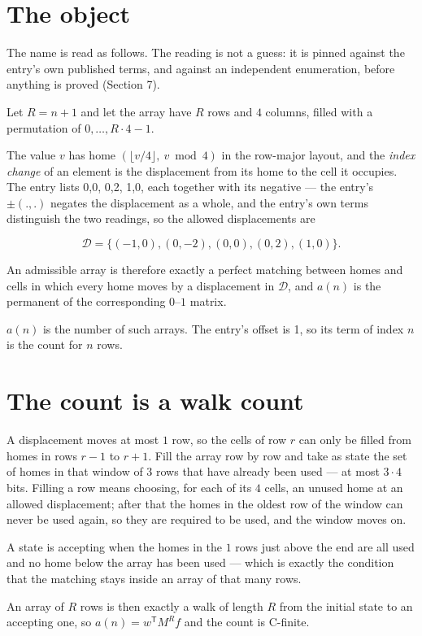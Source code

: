 \documentclass[11pt]{article}
\theoremstyle{definition}
\begin{document}
\section{The object}

The name is read as follows. The reading is not a guess: it is pinned against the entry's own published terms, and against an independent enumeration, before anything is proved (Section 7).

Let $R = n + 1$ and let the array have $R$ rows and $4$ columns, filled with a permutation of $0,\dots,R\cdot4-1$.

The value $v$ has home $(\lfloor v/4\rfloor,\ v \bmod 4)$ in the row-major layout, and the {\itshape index change} of an element is the displacement from its home to the cell it occupies. The entry lists 0,0, 0,2, 1,0, each together with its negative --- the entry's $\pm(.,.)$ negates the displacement as a whole, and the entry's own terms distinguish the two readings, so the allowed displacements are

\[\mathcal{D} = \{(-1,0), (0,-2), (0,0), (0,2), (1,0)\}.\]

An admissible array is therefore exactly a perfect matching between homes and cells in which every home moves by a displacement in $\mathcal{D}$, and $a(n)$ is the permanent of the corresponding $0$--$1$ matrix.

$a(n)$ is the number of such arrays. The entry's offset is 1, so its term of index $n$ is the count for $n$ rows.

\section{The count is a walk count}

A displacement moves at most $1$ row, so the cells of row $r$ can only be filled from homes in rows $r-1$ to $r+1$. Fill the array row by row and take as state the set of homes in that window of $3$ rows that have already been used --- at most $3\cdot4$ bits. Filling a row means choosing, for each of its $4$ cells, an unused home at an allowed displacement; after that the homes in the oldest row of the window can never be used again, so they are required to be used, and the window moves on.

A state is accepting when the homes in the $1$ rows just above the end are all used and no home below the array has been used --- which is exactly the condition that the matching stays inside an array of that many rows.

An array of $R$ rows is then exactly a walk of length $R$ from the initial state to an accepting one, so $a(n) = w^{\mathsf T}M^{R}f$ and the count is C-finite.
\end{document}
